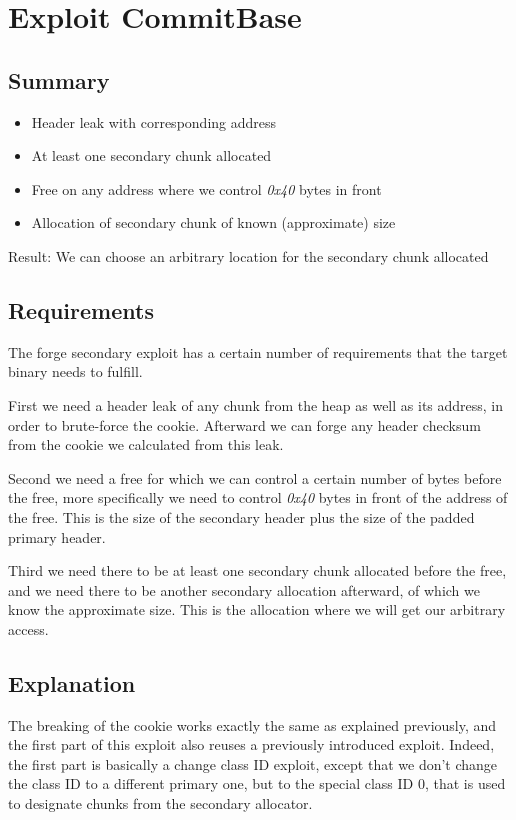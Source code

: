 \documentclass[a4paper,11pt,oneside]{report}
\begin{document}
\section{Exploit CommitBase}

\subsection{Summary}

\begin{itemize}
\item Header leak with corresponding address
\item At least one secondary chunk allocated
\item Free on any address where we control \emph{0x40} bytes in front
\item Allocation of secondary chunk of known (approximate) size
\end{itemize}

Result: We can choose an arbitrary location for the secondary chunk allocated

\subsection{Requirements}

The forge secondary exploit has a certain number of requirements that the target binary
needs to fulfill.

First we need a header leak of any chunk from the heap as well as its address, in
order to brute-force the cookie. Afterward we can forge any header checksum from the
cookie we calculated from this leak.

Second we need a free for which we can control a certain number of bytes before the free,
more specifically we need to control \emph{0x40} bytes in front of the address of the
free. This is the size of the secondary header plus the size of the padded primary header.

Third we need there to be at least one secondary chunk allocated before the free, and we
need there to be another secondary allocation afterward, of which we know the approximate
size. This is the allocation where we will get our arbitrary access.

\subsection{Explanation}

The breaking of the cookie works exactly the same as explained previously, and the first
part of this exploit also reuses a previously introduced exploit. Indeed, the first part is
basically a change class ID exploit, except that we don't change the class ID to a
different primary one, but to the special class ID 0, that is used to designate chunks
from the secondary allocator.
\end{document}
